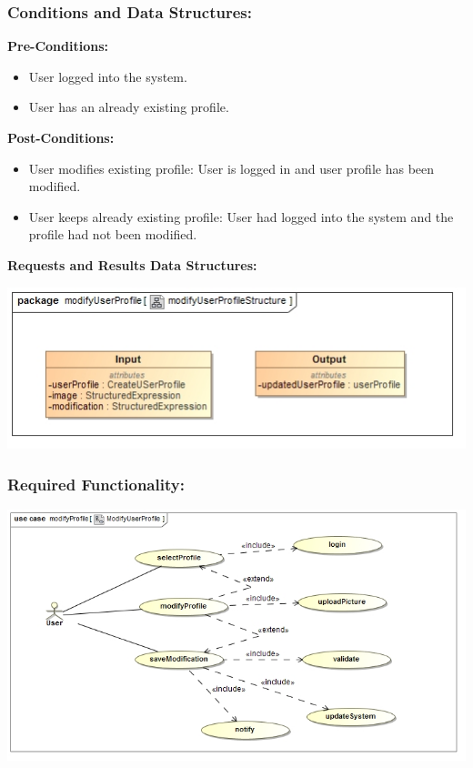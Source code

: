 \documentclass[a4paper,11pt]{article}
\begin{document}
\subsubsection{Conditions and Data Structures:}
\textbf{Pre-Conditions:}
\begin{itemize}
\item User logged into the system. 
\item User has an already existing profile. 
\end{itemize}
\textbf{Post-Conditions:}
\begin{itemize}
\item User modifies existing profile: User is logged in and user profile has been modified. 
\item User keeps already existing profile: User had logged into the system and the profile had not been modified. 
\end{itemize}
\textbf{Requests and Results Data Structures:}
\begin{center}
\includegraphics[width=1\linewidth]{./Images/UserProfile/ModifyUserProfileStructure}
\end{center}
\subsubsection{Required Functionality:}
\includegraphics[width=1\linewidth]{./Images/UserProfile/ModifyUserProfileUseCase}
\end{document}

